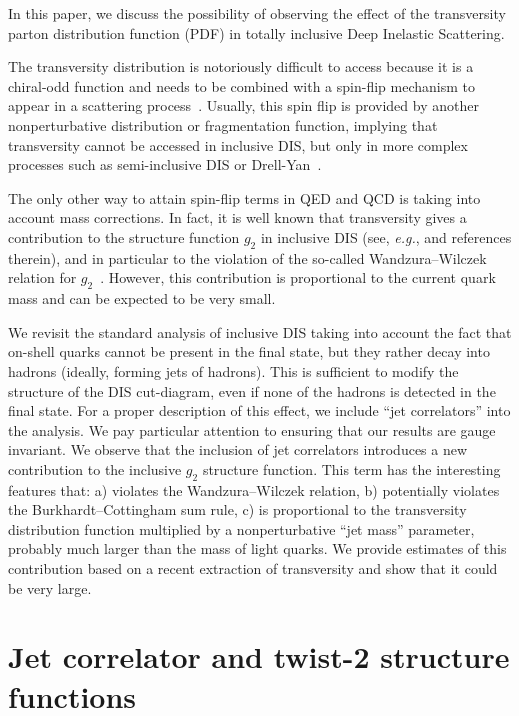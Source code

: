 \documentclass[preprintnumbers,floatfix,nofootinbib]{revtex4}
\newcommand{\eg}{{\em e.g.}}
\begin{document}
In this paper, we discuss the possibility of observing the effect of
the transversity parton distribution function (PDF) in totally inclusive Deep Inelastic Scattering.

The transversity distribution is notoriously difficult to access because it is
a chiral-odd function and needs to be combined with a spin-flip mechanism to
appear in a scattering process~\cite{Jaffe:1996zw,Barone:2001sp}. Usually, this spin flip is provided by another
nonperturbative distribution or fragmentation function, implying that
transversity cannot be accessed in inclusive DIS,
but only in more complex processes such as semi-inclusive DIS or Drell-Yan~\cite{Ralston:1979ys,Jaffe:1991kp,Jaffe:1993xb,Collins:1993kk}. 

The only other way to attain spin-flip terms in QED and QCD is taking into
account mass corrections. In fact, it is well known that transversity gives a
contribution to the structure function $g_2$ in inclusive DIS (see, \eg,
\cite{Accardi:2009au} and references therein), and in
particular to the violation of the so-called Wandzura--Wilczek relation for
$g_2$~\cite{Wandzura:1977qf}. However, this contribution is proportional to the current quark mass
and can be expected to be very small.

We revisit the standard analysis of inclusive DIS taking into account the fact
that on-shell quarks cannot be present in the final state, but they rather
decay into hadrons (ideally, forming jets of hadrons). This is sufficient to modify the structure of the DIS
cut-diagram, even if none of the hadrons is detected in the final
state. For a proper description of this effect, we include ``jet
correlators'' into the analysis. We pay particular attention to ensuring that our
results are gauge invariant. We observe that the inclusion of jet correlators
introduces a new
contribution to the inclusive $g_2$ structure function. This term has the
interesting features that: a) violates the Wandzura--Wilczek relation, b)
potentially violates the Burkhardt--Cottingham sum rule, c) is
proportional to the transversity distribution function multiplied by a
nonperturbative ``jet mass'' parameter, probably much larger than the mass of light
quarks. 
We provide estimates of this
contribution based on a recent extraction of transversity and show that it
could be very large.   
 

\section{Jet correlator and twist-2 structure functions}
\end{document}
